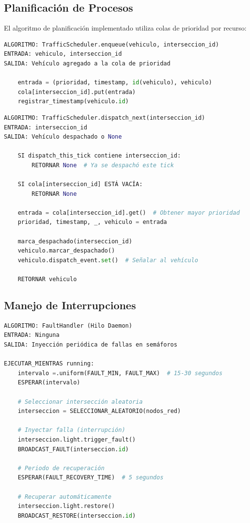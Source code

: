 \documentclass[12pt,a4paper]{article}
\begin{document}
\subsection{Planificación de Procesos}

El algoritmo de planificación implementado utiliza colas de prioridad por recurso:

\begin{lstlisting}[language=python, caption=Planificador por Prioridades]
ALGORITMO: TrafficScheduler.enqueue(vehiculo, interseccion_id)
ENTRADA: vehiculo, interseccion_id
SALIDA: Vehículo agregado a la cola de prioridad

    entrada = (prioridad, timestamp, id(vehiculo), vehiculo)
    cola[interseccion_id].put(entrada)
    registrar_timestamp(vehiculo.id)
\end{lstlisting}

\begin{lstlisting}[language=python, caption=Dispatch de Prioridad]
ALGORITMO: TrafficScheduler.dispatch_next(interseccion_id)
ENTRADA: interseccion_id
SALIDA: Vehículo despachado o None

    SI dispatch_this_tick contiene interseccion_id:
        RETORNAR None  # Ya se despachó este tick
    
    SI cola[interseccion_id] ESTÁ VACÍA:
        RETORNAR None
    
    entrada = cola[interseccion_id].get()  # Obtener mayor prioridad
    prioridad, timestamp, _, vehiculo = entrada
    
    marca_despachado(interseccion_id)
    vehiculo.marcar_despachado()
    vehiculo.dispatch_event.set()  # Señalar al vehículo
    
    RETORNAR vehiculo
\end{lstlisting}

\subsection{Manejo de Interrupciones}

\begin{lstlisting}[language=python, caption=Manejador de Fallas]
ALGORITMO: FaultHandler (Hilo Daemon)
ENTRADA: Ninguna
SALIDA: Inyección periódica de fallas en semáforos

EJECUTAR_MIENTRAS running:
    intervalo =.uniform(FAULT_MIN, FAULT_MAX)  # 15-30 segundos
    ESPERAR(intervalo)
    
    # Seleccionar intersección aleatoria
    interseccion = SELECCIONAR_ALEATORIO(nodos_red)
    
    # Inyectar falla (interrupción)
    interseccion.light.trigger_fault()
    BROADCAST_FAULT(interseccion.id)
    
    # Periodo de recuperación
    ESPERAR(FAULT_RECOVERY_TIME)  # 5 segundos
    
    # Recuperar automáticamente
    interseccion.light.restore()
    BROADCAST_RESTORE(interseccion.id)
\end{lstlisting}
\end{document}
